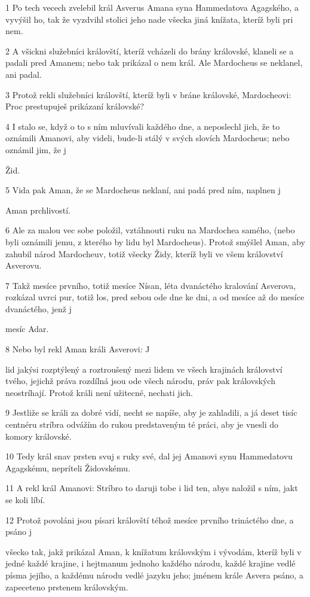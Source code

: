 \par 1 Po tech vecech zvelebil král Asverus Amana syna Hammedatova Agagského, a vyvýšil ho, tak že vyzdvihl stolici jeho nade všecka jiná knížata, kteríž byli pri nem.
\par 2 A všickni služebníci královští, kteríž vcházeli do brány královské, klaneli se a padali pred Amanem; nebo tak prikázal o nem král. Ale Mardocheus se neklanel, ani padal.
\par 3 Protož rekli služebníci královští, kteríž byli v bráne královské, Mardocheovi: Proc prestupuješ prikázaní královské?
\par 4 I stalo se, když o to s ním mluvívali každého dne, a neposlechl jich, že to oznámili Amanovi, aby videli, bude-li stálý v svých slovích Mardocheus; nebo oznámil jim, že j\par Žid.
\par 5 Vida pak Aman, že se Mardocheus neklaní, ani padá pred ním, naplnen j\par Aman prchlivostí.
\par 6 Ale za malou vec sobe položil, vztáhnouti ruku na Mardochea samého, (nebo byli oznámili jemu, z kterého by lidu byl Mardocheus). Protož smýšlel Aman, aby zahubil národ Mardocheuv, totiž všecky Židy, kteríž byli ve všem království Asverovu.
\par 7 Takž mesíce prvního, totiž mesíce Nísan, léta dvanáctého kralování Asverova, rozkázal uvrci pur, totiž los, pred sebou ode dne ke dni, a od mesíce až do mesíce dvanáctého, jenž j\par mesíc Adar.
\par 8 Nebo byl rekl Aman králi Asverovi: J\par lid jakýsi rozptýlený a roztroušený mezi lidem ve všech krajinách království tvého, jejichž práva rozdílná jsou ode všech národu, práv pak královských neostríhají. Protož králi není užitecné, nechati jich.
\par 9 Jestliže se králi za dobré vidí, necht se napíše, aby je zahladili, a já deset tisíc centnéru stríbra odvážím do rukou predstaveným té práci, aby je vnesli do komory královské.
\par 10 Tedy král snav prsten svuj s ruky své, dal jej Amanovi synu Hammedatovu Agagskému, nepríteli Židovskému.
\par 11 A rekl král Amanovi: Stríbro to daruji tobe i lid ten, abys naložil s ním, jakt se koli líbí.
\par 12 Protož povoláni jsou písari královští téhož mesíce prvního trináctého dne, a psáno j\par všecko tak, jakž prikázal Aman, k knížatum královským i vývodám, kteríž byli v jedné každé krajine, i hejtmanum jednoho každého národu, každé krajine vedlé písma jejího, a každému národu vedlé jazyku jeho; jménem krále Asvera psáno, a zapeceteno prstenem královským.
